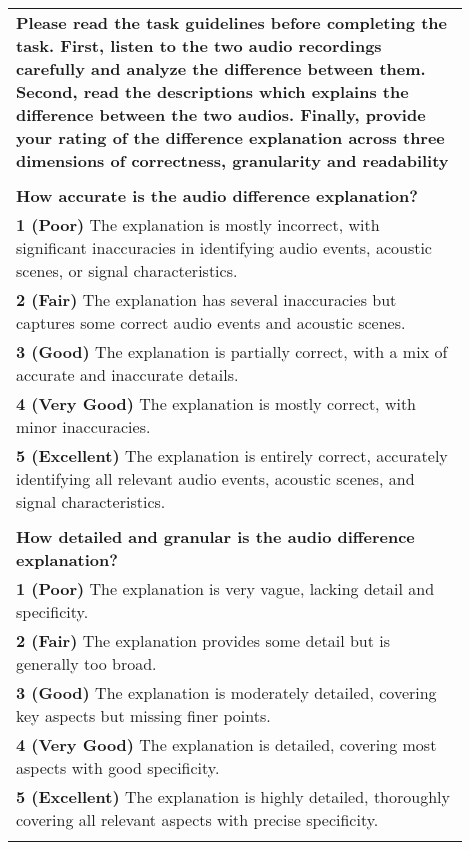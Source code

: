 \begin{table}[ht!]
\centering
\small 
\begin{tabular}{p{0.9\linewidth}}
\toprule\toprule
\textbf{Please read the task guidelines before completing the task. First, listen to the two audio recordings carefully and analyze the difference between them. Second, read the descriptions which explains the difference between the two audios. Finally, provide your rating of the difference explanation across three dimensions of correctness, granularity and readability} 
\\ \\

\textbf{How accurate is the audio difference explanation?}
\\
\textbf{1 (Poor)} The explanation is mostly incorrect, with significant inaccuracies in identifying audio events, acoustic scenes, or signal characteristics.\\
\textbf{2 (Fair)} The explanation has several inaccuracies but captures some correct audio events and acoustic scenes.\\
\textbf{3 (Good)} The explanation is partially correct, with a mix of accurate and inaccurate details.\\
\textbf{4 (Very Good)} The explanation is mostly correct, with minor inaccuracies.\\
\textbf{5 (Excellent)} The explanation is entirely correct, accurately identifying all relevant audio events, acoustic scenes, and signal characteristics.
\\
\\

\textbf{How detailed and granular is the audio difference explanation?}\\
\textbf{1 (Poor)} The explanation is very vague, lacking detail and specificity.\\
\textbf{2 (Fair)}  The explanation provides some detail but is generally too broad.\\
\textbf{3 (Good)}  The explanation is moderately detailed, covering key aspects but missing finer points.\\
\textbf{4 (Very Good)} The explanation is detailed, covering most aspects with good specificity.\\
\textbf{5 (Excellent)} The explanation is highly detailed, thoroughly covering all relevant aspects with precise specificity.
\\
\\
  

\end{tabular}
\end{table}
